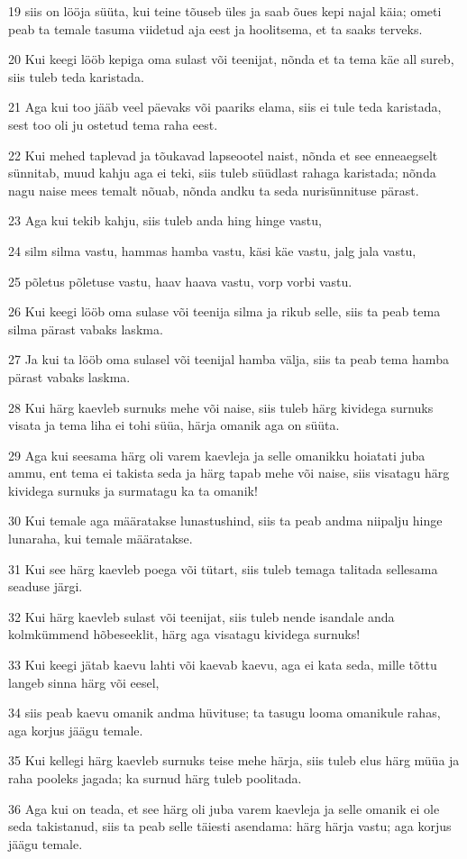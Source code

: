 \par 19 siis on lööja süüta, kui teine tõuseb üles ja saab õues kepi najal käia; ometi peab ta temale tasuma viidetud aja eest ja hoolitsema, et ta saaks terveks.
\par 20 Kui keegi lööb kepiga oma sulast või teenijat, nõnda et ta tema käe all sureb, siis tuleb teda karistada.
\par 21 Aga kui too jääb veel päevaks või paariks elama, siis ei tule teda karistada, sest too oli ju ostetud tema raha eest.
\par 22 Kui mehed taplevad ja tõukavad lapseootel naist, nõnda et see enneaegselt sünnitab, muud kahju aga ei teki, siis tuleb süüdlast rahaga karistada; nõnda nagu naise mees temalt nõuab, nõnda andku ta seda nurisünnituse pärast.
\par 23 Aga kui tekib kahju, siis tuleb anda hing hinge vastu,
\par 24 silm silma vastu, hammas hamba vastu, käsi käe vastu, jalg jala vastu,
\par 25 põletus põletuse vastu, haav haava vastu, vorp vorbi vastu.
\par 26 Kui keegi lööb oma sulase või teenija silma ja rikub selle, siis ta peab tema silma pärast vabaks laskma.
\par 27 Ja kui ta lööb oma sulasel või teenijal hamba välja, siis ta peab tema hamba pärast vabaks laskma.
\par 28 Kui härg kaevleb surnuks mehe või naise, siis tuleb härg kividega surnuks visata ja tema liha ei tohi süüa, härja omanik aga on süüta.
\par 29 Aga kui seesama härg oli varem kaevleja ja selle omanikku hoiatati juba ammu, ent tema ei takista seda ja härg tapab mehe või naise, siis visatagu härg kividega surnuks ja surmatagu ka ta omanik!
\par 30 Kui temale aga määratakse lunastushind, siis ta peab andma niipalju hinge lunaraha, kui temale määratakse.
\par 31 Kui see härg kaevleb poega või tütart, siis tuleb temaga talitada sellesama seaduse järgi.
\par 32 Kui härg kaevleb sulast või teenijat, siis tuleb nende isandale anda kolmkümmend hõbeseeklit, härg aga visatagu kividega surnuks!
\par 33 Kui keegi jätab kaevu lahti või kaevab kaevu, aga ei kata seda, mille tõttu langeb sinna härg või eesel,
\par 34 siis peab kaevu omanik andma hüvituse; ta tasugu looma omanikule rahas, aga korjus jäägu temale.
\par 35 Kui kellegi härg kaevleb surnuks teise mehe härja, siis tuleb elus härg müüa ja raha pooleks jagada; ka surnud härg tuleb poolitada.
\par 36 Aga kui on teada, et see härg oli juba varem kaevleja ja selle omanik ei ole seda takistanud, siis ta peab selle täiesti asendama: härg härja vastu; aga korjus jäägu temale.

